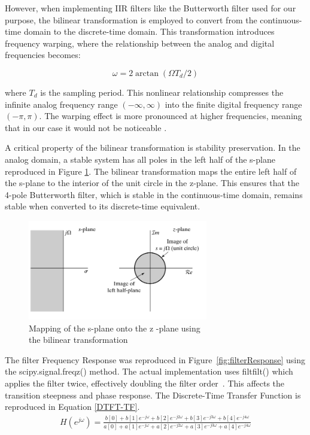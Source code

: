 However, when implementing IIR filters like the Butterworth filter used for our purpose, the bilinear transformation is employed to convert from the continuous-time domain to the discrete-time domain. This transformation introduces frequency warping, where the relationship between the analog and digital frequencies becomes:

$$\omega = 2 \arctan(\Omega T_d/2)$$

where $T_d$ is the sampling period. This nonlinear relationship compresses the infinite analog frequency range $(-\infty, \infty)$ into the finite digital frequency range $(-\pi, \pi)$. The warping effect is more pronounced at higher frequencies, meaning that in our case it would not be noticeable \cite[p.529-530]{RefWorks:oppenheim2013discrete-time}.

A critical property of the bilinear transformation is stability preservation. In the analog domain, a stable system has all poles in the left half of the s-plane reproduced in Figure \ref{fig:unitCircle}. The bilinear transformation maps the entire left half of the s-plane to the interior of the unit circle in the z-plane. This ensures that the 4-pole Butterworth filter, which is stable in the continuous-time domain, remains stable when converted to its discrete-time equivalent. 
\begin{figure}[htbp] 
  \centering
  \includegraphics[width=0.7\textwidth]{chapters/methodology/ArduinoDAQ/oppenheimMappingCircle.png}
  \caption{Mapping of the s-plane onto the z -plane using \\ the bilinear transformation~\cite[p.130]{RefWorks:oppenheim2013discrete-time}}
  \label{fig:unitCircle}
\end{figure}

The filter Frequency Response was reproduced in Figure~\ref{fig:filterResponse} using the scipy.signal\-.freqz() method. The actual implementation uses filtfilt() which applies the filter twice, effectively doubling the filter order~\cite{RefWorks:2025filtfilt}. This affects the transition steepness and phase response. The Discrete-Time Transfer Function is reproduced in Equation \ref{DTFT-TF}.
\begin{equation} \label{DTFT-TF}
  \begin{split}
    H(e^{j\omega}) = \frac{b[0] + b[1]e^{-j\omega} + b[2]e^{-j2\omega} + b[3]e^{-j3\omega} + b[4]e^{-j4\omega}}{a[0] + a[1]e^{-j\omega} + a[2]e^{-j2\omega} + a[3]e^{-j3\omega} + a[4]e^{-j4\omega}}
  \end{split}
\end{equation}


